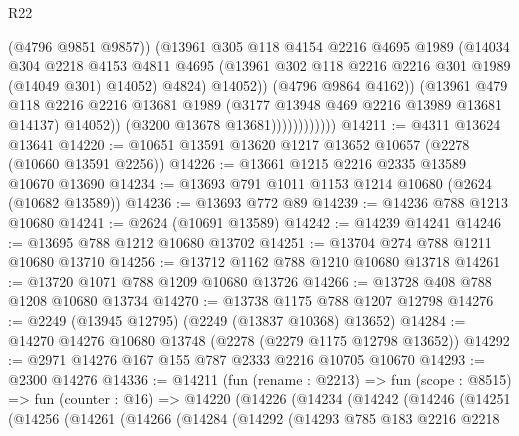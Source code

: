 \begin{lexlean}{R22}
\begin{coremodule}
                                  (@4796 @9851 @9857))
                                (@13961
                                  @305
                                  @118
                                  @4154
                                  @2216
                                  @4695
                                  @1989
                                  (@14034
                                    @304
                                    @2218
                                    @4153
                                    @4811
                                    @4695
                                    (@13961 @302 @118 @2216 @2216 @301 @1989 (@14049 @301) @14052)
                                    @4824)
                                  @14052))
                              (@4796 @9864 @4162))
                            (@13961
                              @479
                              @118
                              @2216
                              @2216
                              @13681
                              @1989
                              (@3177 @13948 @469 @2216 @13989 @13681 @14137)
                              @14052))
                          (@3200 @13678 @13681))))))))))))
@14211 := @4311 @13624 @13641
@14220 := @10651 @13591 @13620 @1217 @13652 @10657 (@2278 (@10660 @13591 @2256))
@14226 := @13661 @1215 @2216 @2335 @13589 @10670 @13690
@14234 := @13693 @791 @1011 @1153 @1214 @10680 (@2624 (@10682 @13589))
@14236 := @13693 @772 @89
@14239 := @14236 @788 @1213 @10680
@14241 := @2624 (@10691 @13589)
@14242 := @14239 @14241
@14246 := @13695 @788 @1212 @10680 @13702
@14251 := @13704 @274 @788 @1211 @10680 @13710
@14256 := @13712 @1162 @788 @1210 @10680 @13718
@14261 := @13720 @1071 @788 @1209 @10680 @13726
@14266 := @13728 @408 @788 @1208 @10680 @13734
@14270 := @13738 @1175 @788 @1207 @12798
@14276 := @2249 (@13945 @12795) (@2249 (@13837 @10368) @13652)
@14284 := @14270 @14276 @10680 @13748 (@2278 (@2279 @1175 @12798 @13652))
@14292 := @2971 @14276 @167 @155 @787 @2333 @2216 @10705 @10670
@14293 := @2300 @14276
@14336 := @14211
    (fun (rename : @2213) =>
    fun (scope : @8515) =>
    fun (counter : @16) =>
    @14220
      (@14226
        (@14234
          (@14242
            (@14246
              (@14251
                (@14256
                  (@14261
                    (@14266
                      (@14284
                        (@14292
                          (@14293
                            @785
                            @183
                            @2216
                            @2218

\end{coremodule}
\end{lexlean}
